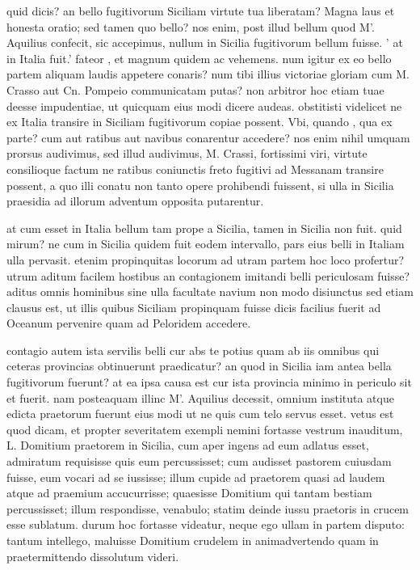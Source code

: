  quid dicis? an bello fugitivorum Siciliam virtute tua liberatam? Magna laus et honesta oratio; sed tamen quo bello? nos enim, post illud bellum quod M'. Aquilius confecit, sic accepimus, nullum in Sicilia fugitivorum bellum fuisse. ' at in Italia fuit.' fateor , et magnum quidem ac vehemens. num igitur ex eo bello partem aliquam laudis appetere conaris? num tibi illius victoriae gloriam cum M. Crasso aut Cn. Pompeio communicatam putas? non arbitror hoc etiam tuae deesse impudentiae, ut quicquam eius modi dicere audeas. obstitisti videlicet ne ex Italia transire in Siciliam fugitivorum copiae possent. Vbi, quando , qua ex parte? cum aut ratibus aut navibus conarentur accedere? nos enim nihil umquam prorsus audivimus, sed illud audivimus, M. Crassi, fortissimi viri, virtute consilioque factum ne ratibus coniunctis freto fugitivi ad Messanam transire possent, a quo illi conatu non tanto opere prohibendi fuissent, si ulla in Sicilia praesidia ad illorum adventum opposita putarentur.

 at cum esset in Italia bellum tam prope a Sicilia, tamen in Sicilia non fuit. quid mirum? ne cum in Sicilia quidem fuit eodem intervallo, pars eius belli in Italiam ulla pervasit. etenim propinquitas locorum ad utram partem hoc loco profertur? utrum aditum facilem hostibus an contagionem imitandi belli periculosam fuisse? aditus omnis hominibus sine ulla facultate navium non modo disiunctus sed etiam clausus est, ut illis quibus Siciliam propinquam fuisse dicis facilius fuerit ad Oceanum pervenire quam ad Peloridem accedere.

 contagio autem ista servilis belli cur abs te potius quam ab iis omnibus qui ceteras provincias obtinuerunt praedicatur? an quod in Sicilia iam antea bella fugitivorum fuerunt? at ea ipsa causa est cur ista provincia minimo in periculo sit et fuerit. nam posteaquam illinc M'. Aquilius decessit, omnium instituta atque edicta praetorum fuerunt eius modi ut ne quis cum telo servus esset. vetus est quod dicam, et propter severitatem exempli nemini fortasse vestrum inauditum, L. Domitium praetorem in Sicilia, cum aper ingens ad eum adlatus esset, admiratum requisisse quis eum percussisset; cum audisset pastorem cuiusdam fuisse, eum vocari ad se iussisse; illum cupide ad praetorem quasi ad laudem atque ad praemium accucurrisse; quaesisse Domitium qui tantam bestiam percussisset; illum respondisse, venabulo; statim deinde iussu praetoris in crucem esse sublatum. durum hoc fortasse videatur, neque ego ullam in partem disputo: tantum intellego, maluisse Domitium crudelem in animadvertendo quam in praetermittendo dissolutum videri.

